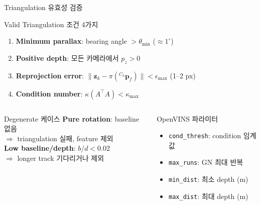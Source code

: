 \begin{frame}[shrink=10]{Triangulation 유효성 검증}
  \begin{block}{Valid Triangulation 조건 4가지}
    \begin{enumerate}
      \item \textbf{Minimum parallax}: bearing angle $> \theta_{\min}$ ($\approx 1^\circ$)
      \item \textbf{Positive depth}: 모든 카메라에서 $p_z > 0$
      \item \textbf{Reprojection error}: $\|\bm{z}_k - \pi({}^{C_k}\bm{p}_f)\| < \epsilon_{\max}$ (1--2 px)
      \item \textbf{Condition number}: $\kappa(A^\top A) < \kappa_{\max}$
    \end{enumerate}
  \end{block}
  \begin{columns}[T]
      \begin{alertblock}{Degenerate 케이스}
        \textbf{Pure rotation}: baseline 없음\\
        $\Rightarrow$ triangulation 실패, feature 제외\\[0.5em]
        \textbf{Low baseline/depth}: $b/d < 0.02$\\
        $\Rightarrow$ longer track 기다리거나 제외
      \end{alertblock}
      \begin{exampleblock}{OpenVINS 파라미터}
        \begin{itemize}
          \item \texttt{cond\_thresh}: condition 임계값
          \item \texttt{max\_runs}: GN 최대 반복
          \item \texttt{min\_dist}: 최소 depth (m)
          \item \texttt{max\_dist}: 최대 depth (m)
        \end{itemize}
      \end{exampleblock}
  \end{columns}
\end{frame}


